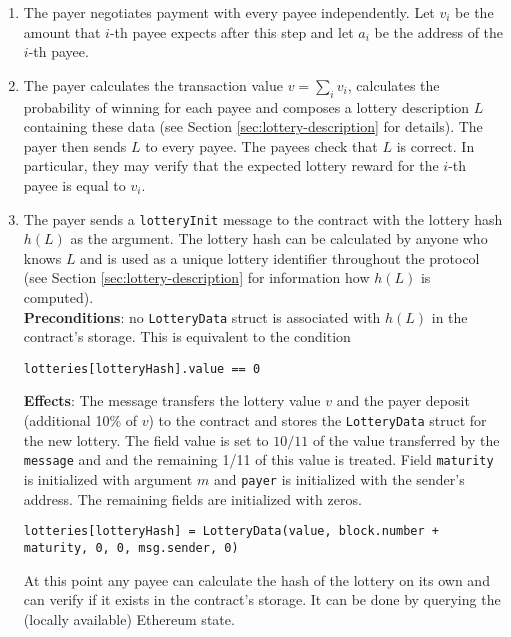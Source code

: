 \documentclass[a4paper]{article}
\begin{document}
    \begin{enumerate}
        \item The payer negotiates payment with every payee independently. Let $v_i$ be the amount that $i$-th payee
            expects after this step and let $a_i$ be the address of the $i$-th payee.
        \item The payer calculates the transaction value $v = \sum_i v_i$, calculates the probability of winning
            for each payee and composes a lottery description $L$ containing these data (see Section
            \ref{sec:lottery-description} for details). The payer then sends $L$ to every payee. The payees check that $L$
            is correct. In particular, they may verify that the expected lottery reward for the $i$-th payee is equal
            to $v_i$.
        \item The payer sends a \texttt{lotteryInit} message to the contract with the lottery hash $h(L)$ as the
            argument. The lottery hash can be calculated by anyone who knows $L$ and is used as a unique lottery
            identifier throughout the protocol (see Section \ref{sec:lottery-description} for information how $h(L)$ is
            computed).\\
            \textbf{Preconditions}: no \texttt{LotteryData} struct is associated with $h(L)$ in the contract's
            storage. This is equivalent to the condition
            \begin{center}
	            \texttt{lotteries[lotteryHash].value == 0}
	        \end{center}
            \textbf{Effects}: The message transfers the lottery value $v$ and the payer deposit (additional 10\%
            of $v$) to the contract and stores the \texttt{LotteryData} struct for the new lottery. The field value
            is set to $10/11$ of the value transferred by the \texttt{message} and and the remaining 1/11 of this value
            is treated. Field \texttt{maturity} is initialized with argument $m$ and \texttt{payer} is initialized with
            the sender's address. The remaining fields are initialized with zeros.
            \begin{center}
            \texttt{lotteries[lotteryHash] = LotteryData(value, block.number + maturity, 0, 0, msg.sender, 0)}
            \end{center}
            At this point any payee can calculate the hash of the lottery on its own and can verify if it exists in
            the contract's storage. It can be done by querying the (locally available) Ethereum state.

\end{enumerate}
\end{document}
